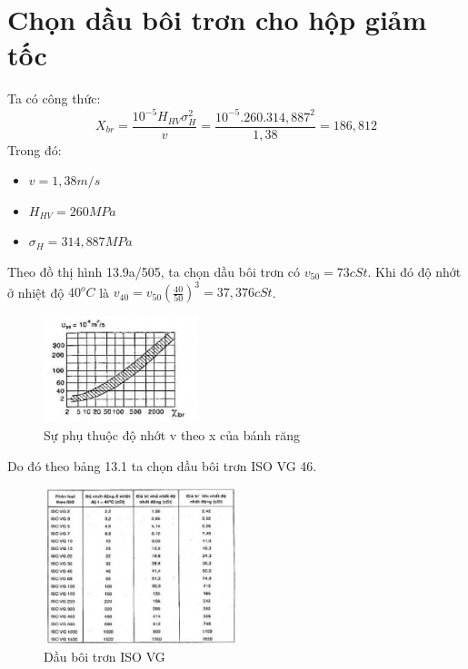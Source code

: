 \section{Chọn dầu bôi trơn cho hộp giảm tốc}
Ta có công thức:
\[
    X_{br} = \frac{10^{-5}H_{HV}\sigma_H^2}{v} = \frac{10^{-5}.260.314,887^2}{1,38} = 186,812
\]
Trong đó: 
\begin{itemize}
    \item $v = 1,38 m/s$
    \item $H_{HV} = 260MPa$
    \item   $\sigma_H = 314,887MPa$
\end{itemize}
Theo đồ thị hình 13.9a/505, ta chọn dầu bôi trơn có $v_{50} = 73 cSt$. Khi đó độ nhớt ở nhiệt độ $40^oC$ là $v_{40} = v_{50}(\frac{40}{50})^3 = 37,376 cSt$.
\begin{figure}[H]
    \centering
    \includegraphics[width=0.4\textwidth]{pictures/nhot1.png}
    \caption{Sự phụ thuộc độ nhớt v theo x của bánh răng}
\end{figure}
Do đó theo bảng 13.1 ta chọn dầu bôi trơn ISO VG 46.
\begin{figure}[H]
    \centering
    \includegraphics[width=0.5\textwidth]{pictures/nhot2.png}
    \caption{Dầu bôi trơn ISO VG}
\end{figure}
\cleardoublepage